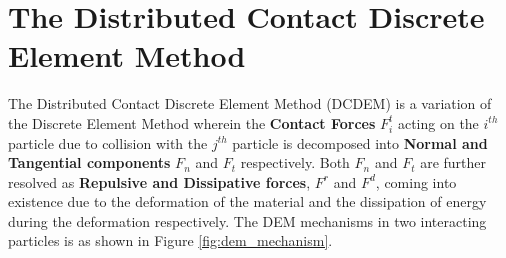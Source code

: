 \chapter{The Distributed Contact Discrete Element Method}

The Distributed Contact Discrete Element Method (DCDEM) \cite{canelas} is a variation of the Discrete Element Method wherein the \textbf{Contact Forces }$F^t_i$  acting on the $i^{th}$ particle due to collision with the $j^{th}$ particle is decomposed into \textbf{Normal and Tangential components}  $F_n$ and $F_t$ respectively. Both $F_n$ and $F_t$ are further resolved as \textbf{Repulsive and Dissipative forces},  $F^r$ and $F^d$, coming into existence due to the deformation of the material and the dissipation of energy during the deformation respectively. The DEM mechanisms in two interacting particles is as shown in Figure \ref{fig:dem_mechanism}.

